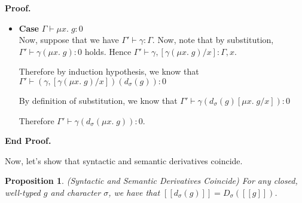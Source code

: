 \documentclass{article}
\newcommand{\fix}[2]{\mu {#1}.\;{#2}}
\newcommand{\judgebalance}[3][\Gamma]{{#1} \vdash {#2} : {#3}}
\newcommand{\judgesubst}[3]{{#1} \vdash {#2} : {#3}}
\newcommand{\interp}[1]{[\![{#1}]\!]}
\newcommand{\semderiv}[2]{D_{#1}({#2})}
\newcommand{\deriv}[2]{d_{#1}({#2})}
\newtheorem{prop}{Proposition}
\newenvironment{proof}{\noindent\textbf{Proof.}}
{\noindent\textbf{End Proof.}}
\newenvironment{caseblock}{\begin{itemize}}{\end{itemize}}
\newenvironment{case}[1]{\item \textbf{Case} {#1}\\}{}
\begin{document}
\begin{proof}
\begin{caseblock}
\begin{case}{$\judgebalance{\fix{x}{g}}{0}$}
      Now, suppose that we have $\judgesubst{\Gamma'}{\gamma}{\Gamma}$. Now, note that 
      by substitution, $\judgebalance[\Gamma']{\gamma(\fix{x}{g})}{0}$ holds. Hence
      $\judgesubst{\Gamma'}{\gamma, [\gamma(\fix{x}{g})/x]}{\Gamma,x}$. 

      Therefore by induction hypothesis, we know that $\judgebalance[\Gamma']{(\gamma, [\gamma(\fix{x}{g})/x])(\deriv{\sigma}{g})}{0}$

      By definition of substitution, we know that $\judgebalance[\Gamma']{\gamma(\deriv{\sigma}{g}[\fix{x}{g}/x])}{0}$

      Therefore $\judgebalance[\Gamma']{\gamma(\deriv{\sigma}{\fix{x}{g}})}{0}$. 
    \end{case}
  \end{caseblock}
\end{proof}







Now, let's show that syntactic and semantic derivatives coincide. 

\begin{prop}{(Syntactic and Semantic Derivatives Coincide)}
For any closed, well-typed $g$ and character $\sigma$, we have that
$\interp{\deriv{\sigma}{g}} = \semderiv{\sigma}{\interp{g}}$.
\end{prop}
\end{document}
